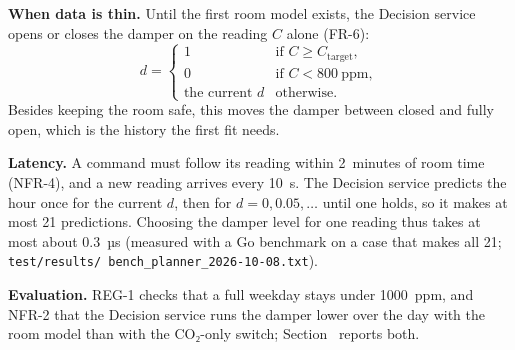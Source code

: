 \documentclass[11pt]{article}
\makeatletter
\newcommand{\reqfield}[2]{\csname req@#1@#2\endcsname}
\newcommand{\req}[1]{\pdftooltip{\hyperlink{req:#1}{#1}}%
  {#1: \reqfield{#1}{text}. Criterion: \reqfield{#1}{criterion}.}}
\def\ref#1{\getrefnumber{#1}}%
\def\req#1{#1}}
\makeatother
\begin{document}
\textbf{When data is thin.} Until the first room model exists, the
Decision service opens or closes the damper on the reading $C$ alone
(\req{FR-6}):
\begin{equation}\label{eq:switch}
  d = \begin{cases}
    1 & \text{if } C \geq C_\text{target}, \\
    0 & \text{if } C < 800~\text{ppm}, \\
    \text{the current } d & \text{otherwise.}
  \end{cases}
\end{equation}
Besides keeping the room safe, this moves the damper between
closed and fully open, which is the history the first fit needs.

\textbf{Latency.} A command must follow its reading within 2~minutes of
room time (\req{NFR-4}), and a new reading arrives every 10~s. The Decision
service predicts the hour once for the current $d$, then for
$d = 0, 0.05, \dots$ until one holds, so it makes at most 21 predictions.
Choosing the damper level for one reading thus takes at most about
0.3~µs (measured with a Go benchmark on a case that makes all 21;
\texttt{test/results/\allowbreak
bench\_planner\_2026-10-08.txt}).

\textbf{Evaluation.} \req{REG-1} checks that a full weekday stays under
1000~ppm, and \req{NFR-2} that the Decision service runs the damper lower over the day
with the room model than with the CO₂-only switch; Section~\ref{sec:evaluation} reports both.
\end{document}
